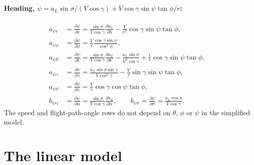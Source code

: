 \documentclass[11pt]{report}
\numberwithin{equation}{chapter}
\newcommand{\pd}[2]{\frac{\partial #1}{\partial #2}}
\newcommand{\aL}{a_L}
\begin{document}
\paragraph{Heading, $\dot\psi = \aL\sin\sigma/(V\cos\gamma) + V\cos\gamma\sin\psi\tan\phi/r$:}
\begin{align}
  a_{\psi r} &= \pd{\dot\psi}{r} = \frac{\sin\sigma}{V\cos\gamma}\pd{\aL}{h}
     - \frac{V}{r^2}\cos\gamma\sin\psi\tan\phi, \\
  a_{\psi\phi} &= \pd{\dot\psi}{\phi} = \frac{V}{r}\frac{\cos\gamma\sin\psi}{\cos^2\phi}, \\
  a_{\psi V} &= \pd{\dot\psi}{V} = \frac{\sin\sigma}{V\cos\gamma}\pd{\aL}{V}
     - \frac{\aL\sin\sigma}{V^2\cos\gamma} + \frac{1}{r}\cos\gamma\sin\psi\tan\phi, \\
  a_{\psi\gamma} &= \pd{\dot\psi}{\gamma} = \frac{\aL\sin\sigma\sin\gamma}{V\cos^2\gamma}
     - \frac{V}{r}\sin\gamma\sin\psi\tan\phi, \\
  a_{\psi\psi} &= \pd{\dot\psi}{\psi} = \frac{V}{r}\cos\gamma\cos\psi\tan\phi, \\
  b_{\psi\alpha} &= \pd{\dot\psi}{\alpha} = \frac{\sin\sigma}{V\cos\gamma}\pd{\aL}{\alpha}, \qquad
  b_{\psi\sigma} = \pd{\dot\psi}{\sigma} = \frac{\aL\cos\sigma}{V\cos\gamma} .
\end{align}
The speed and flight-path-angle rows do not depend on $\theta$, $\phi$ or $\psi$ in the
simplified model.

\section{The linear model}
\end{document}
